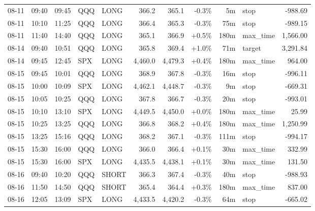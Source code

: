 \documentclass[11pt,a4paper,twoside]{article}
\begin{document}
\begin{center}
\begin{longtable}{>{\color{txtmain}}l l l l l r r r r >{\color{txtmain}}l r}
08-11 & 09:40 & 09:45 & QQQ & LONG & 366.2 & 365.1 & \textcolor{lossred}{-0.3\%} & 5m & stop & \textcolor{lossred}{-988.69} \\
08-11 & 10:10 & 11:25 & QQQ & LONG & 366.4 & 365.3 & \textcolor{lossred}{-0.3\%} & 75m & stop & \textcolor{lossred}{-989.15} \\
08-11 & 11:40 & 14:40 & QQQ & LONG & 365.1 & 366.9 & \textcolor{wingreen}{+0.5\%} & 180m & max\_time & \textcolor{wingreen}{1,566.00} \\
08-14 & 09:40 & 10:51 & QQQ & LONG & 365.8 & 369.4 & \textcolor{wingreen}{+1.0\%} & 71m & target & \textcolor{wingreen}{3,291.84} \\
08-14 & 09:45 & 12:45 & SPX & LONG & 4,460.0 & 4,479.3 & \textcolor{wingreen}{+0.4\%} & 180m & max\_time & \textcolor{wingreen}{964.00} \\
08-15 & 09:45 & 10:01 & QQQ & LONG & 368.9 & 367.8 & \textcolor{lossred}{-0.3\%} & 16m & stop & \textcolor{lossred}{-996.11} \\
08-15 & 10:00 & 10:09 & SPX & LONG & 4,462.1 & 4,448.7 & \textcolor{lossred}{-0.3\%} & 9m & stop & \textcolor{lossred}{-669.31} \\
08-15 & 10:05 & 10:25 & QQQ & LONG & 367.8 & 366.7 & \textcolor{lossred}{-0.3\%} & 20m & stop & \textcolor{lossred}{-993.01} \\
08-15 & 10:10 & 13:10 & SPX & LONG & 4,449.5 & 4,450.0 & \textcolor{wingreen}{+0.0\%} & 180m & max\_time & \textcolor{wingreen}{25.99} \\
08-15 & 10:25 & 13:25 & QQQ & LONG & 366.8 & 368.2 & \textcolor{wingreen}{+0.4\%} & 180m & max\_time & \textcolor{wingreen}{1,250.99} \\
08-15 & 13:25 & 15:16 & QQQ & LONG & 368.2 & 367.1 & \textcolor{lossred}{-0.3\%} & 111m & stop & \textcolor{lossred}{-994.17} \\
08-15 & 15:30 & 16:00 & QQQ & LONG & 366.0 & 366.4 & \textcolor{wingreen}{+0.1\%} & 30m & max\_time & \textcolor{wingreen}{332.99} \\
08-15 & 15:30 & 16:00 & SPX & LONG & 4,435.5 & 4,438.1 & \textcolor{wingreen}{+0.1\%} & 30m & max\_time & \textcolor{wingreen}{131.50} \\
08-16 & 09:40 & 10:20 & QQQ & SHORT & 366.3 & 367.4 & \textcolor{lossred}{-0.3\%} & 40m & stop & \textcolor{lossred}{-988.93} \\
08-16 & 11:50 & 14:50 & QQQ & SHORT & 365.4 & 364.4 & \textcolor{wingreen}{+0.3\%} & 180m & max\_time & \textcolor{wingreen}{837.00} \\
08-16 & 12:05 & 13:09 & SPX & LONG & 4,433.5 & 4,420.2 & \textcolor{lossred}{-0.3\%} & 64m & stop & \textcolor{lossred}{-665.02} \\

\end{longtable}
\end{center}
\end{document}
